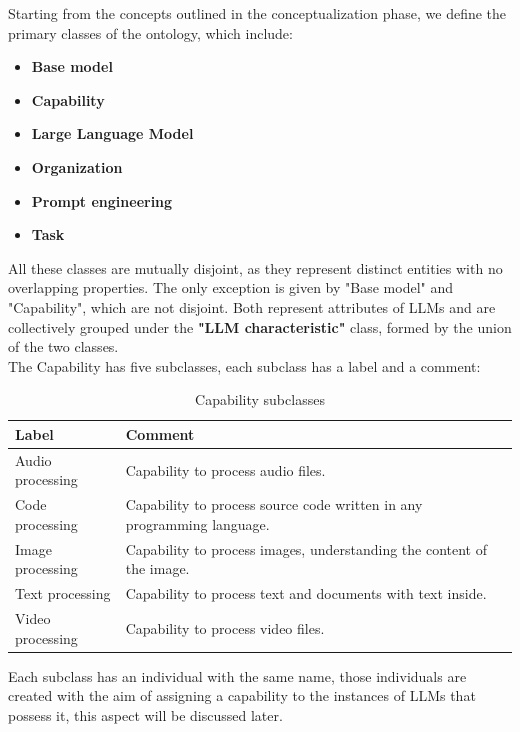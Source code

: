 Starting from the concepts outlined in the conceptualization phase, we define the primary classes of the ontology, which include:
\begin{itemize}
    \item \textbf{Base model}

    \item \textbf{Capability}

    \item \textbf{Large Language Model}

    \item \textbf{Organization}

    \item \textbf{Prompt engineering}

    \item \textbf{Task}
\end{itemize}
All these classes are mutually disjoint, as they represent distinct entities with no overlapping properties.
The only exception is given by "Base model" and "Capability", which are not disjoint.
Both represent attributes of LLMs and are collectively grouped under the \textbf{"LLM characteristic"} class, formed by the union of the two classes. \\
The Capability has five subclasses, each subclass has a label and a comment:
\begin{table}[H]
    \centering
    \begin{tabular}{|>{\raggedright\arraybackslash}p{6cm}|>{\raggedright\arraybackslash}p{6cm}|}
        \hline
        \textbf{Label} & \textbf{Comment} \\ \hline
         Audio processing &  Capability to process audio files. \\ \hline
         
         Code processing & Capability to process source code written in any programming language. \\ \hline
         
         Image processing & Capability to process images, understanding the content of the image. \\ \hline
         
         Text processing & Capability to process text and documents with text inside. \\ \hline
         
         Video processing & Capability to process video files. \\ \hline
    \end{tabular}
    \caption{Capability subclasses}
\end{table}
Each subclass has an individual with the same name, those individuals are created with the aim of assigning a capability to the instances of LLMs that possess it, this aspect will be discussed later.

